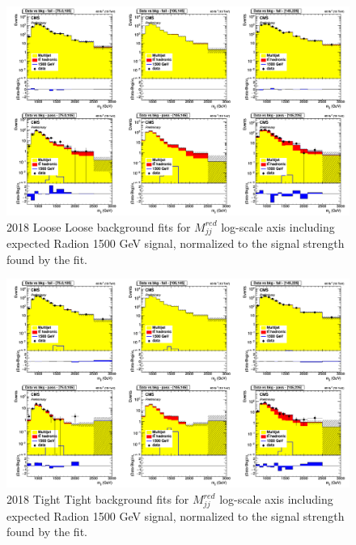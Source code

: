 \begin{figure}[!htb]
	\centering
	\includegraphics[width=1\textwidth]{Figures/postfit_projy_fits_log_18LL.png}
	\caption{2018 Loose Loose background fits for $M_{jj}^{red}$ log-scale axis including expected Radion 1500 GeV signal, normalized to the signal strength found by the fit.}
	\label{fig:18LLlog}
\end{figure}
\begin{figure}[!htb]
	\centering
	\includegraphics[width=1\textwidth]{Figures/postfit_projy_fits_log_18TT.png}
	\caption{2018 Tight Tight background fits for $M_{jj}^{red}$ log-scale axis including expected Radion 1500 GeV signal, normalized to the signal strength found by the fit.}
	\label{fig:18TTlog}
\end{figure}
\clearpage
